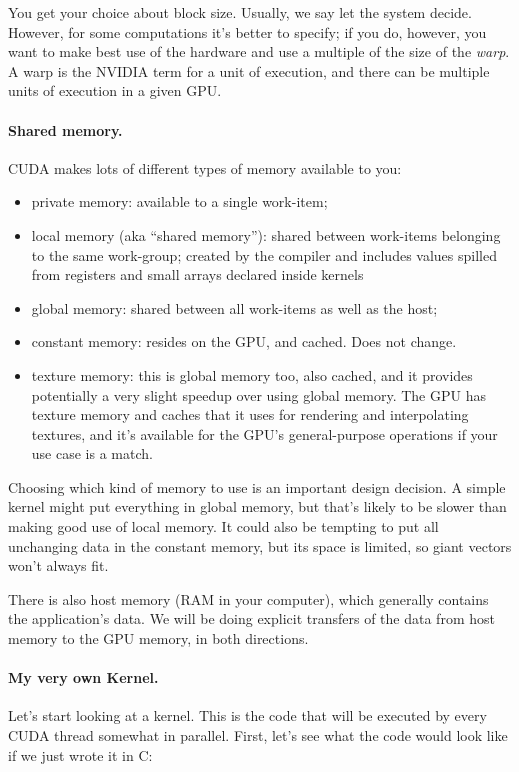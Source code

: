 \documentclass[a4paper]{report}
\newcommand{\CPP}{C\nolinebreak\hspace{-.05em}\raisebox{.4ex}{\tiny\bf +}\nolinebreak\hspace{-.10em}\raisebox{.4ex}{\tiny\bf +}}
\def\CPP{{C\nolinebreak[4]\hspace{-.05em}\raisebox{.4ex}{\tiny\bf ++}}}
\begin{document}
You get your choice about block size. Usually, we say let the system decide. However, for some computations it's better to specify; if you do, however, you want to make best use of the hardware and use a multiple of the size of the \textit{warp}. A warp is the NVIDIA term for a unit of execution, and there can be multiple units of execution in a given GPU.

\paragraph{Shared memory.} CUDA makes lots of different types of
memory available to you:

\begin{itemize}
\item private memory: available to a single work-item;
\item local memory (aka ``shared memory''): shared between work-items
  belonging to the same work-group; created by the compiler and includes values spilled from registers and small arrays declared inside kernels~\cite{micikevicius11:_local_memor_regis_spill}
\item global memory: shared between all work-items as well as the host;
\item constant memory: resides on the GPU, and cached. Does not change.
\item texture memory: this is global memory too, also cached, and it provides potentially a very slight speedup over using global memory. The GPU has texture memory and caches that it uses for rendering and interpolating textures, and it's available for the GPU's general-purpose operations if your use case is a match. 
\end{itemize}

Choosing which kind of memory to use is an important design decision. A simple kernel might put everything in global memory, but that's likely to be slower than making good use of local memory. It could also be tempting to put all unchanging data in the constant memory, but its space is limited, so giant vectors won't always fit.

There is also host memory (RAM in your computer), which generally contains the application's data. We will be doing explicit transfers of the data from host memory to the GPU memory, in both directions.

\paragraph{My very own Kernel.} Let's start looking at a kernel. This is the code that will be executed by every CUDA thread somewhat in parallel. First, let's see what the code would look like if we just wrote it in \CPP:
\end{document}
